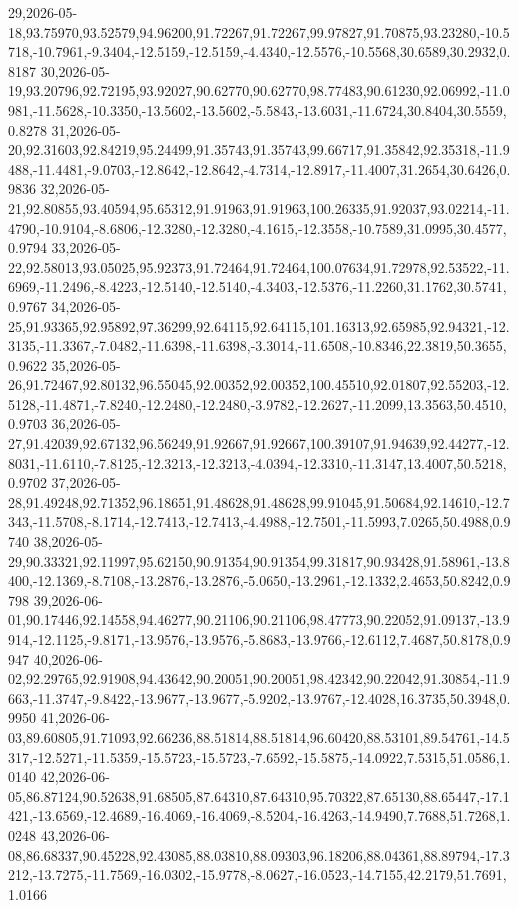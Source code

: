 \documentclass{eic-bcc-tcc}
\begin{document}
{29,2026-05-18,93.75970,93.52579,94.96200,91.72267,91.72267,99.97827,91.70875,93.23280,-10.5718,-10.7961,-9.3404,-12.5159,-12.5159,-4.4340,-12.5576,-10.5568,30.6589,30.2932,0.8187
30,2026-05-19,93.20796,92.72195,93.92027,90.62770,90.62770,98.77483,90.61230,92.06992,-11.0981,-11.5628,-10.3350,-13.5602,-13.5602,-5.5843,-13.6031,-11.6724,30.8404,30.5559,0.8278
31,2026-05-20,92.31603,92.84219,95.24499,91.35743,91.35743,99.66717,91.35842,92.35318,-11.9488,-11.4481,-9.0703,-12.8642,-12.8642,-4.7314,-12.8917,-11.4007,31.2654,30.6426,0.9836
32,2026-05-21,92.80855,93.40594,95.65312,91.91963,91.91963,100.26335,91.92037,93.02214,-11.4790,-10.9104,-8.6806,-12.3280,-12.3280,-4.1615,-12.3558,-10.7589,31.0995,30.4577,0.9794
33,2026-05-22,92.58013,93.05025,95.92373,91.72464,91.72464,100.07634,91.72978,92.53522,-11.6969,-11.2496,-8.4223,-12.5140,-12.5140,-4.3403,-12.5376,-11.2260,31.1762,30.5741,0.9767
34,2026-05-25,91.93365,92.95892,97.36299,92.64115,92.64115,101.16313,92.65985,92.94321,-12.3135,-11.3367,-7.0482,-11.6398,-11.6398,-3.3014,-11.6508,-10.8346,22.3819,50.3655,0.9622
35,2026-05-26,91.72467,92.80132,96.55045,92.00352,92.00352,100.45510,92.01807,92.55203,-12.5128,-11.4871,-7.8240,-12.2480,-12.2480,-3.9782,-12.2627,-11.2099,13.3563,50.4510,0.9703
36,2026-05-27,91.42039,92.67132,96.56249,91.92667,91.92667,100.39107,91.94639,92.44277,-12.8031,-11.6110,-7.8125,-12.3213,-12.3213,-4.0394,-12.3310,-11.3147,13.4007,50.5218,0.9702
37,2026-05-28,91.49248,92.71352,96.18651,91.48628,91.48628,99.91045,91.50684,92.14610,-12.7343,-11.5708,-8.1714,-12.7413,-12.7413,-4.4988,-12.7501,-11.5993,7.0265,50.4988,0.9740
38,2026-05-29,90.33321,92.11997,95.62150,90.91354,90.91354,99.31817,90.93428,91.58961,-13.8400,-12.1369,-8.7108,-13.2876,-13.2876,-5.0650,-13.2961,-12.1332,2.4653,50.8242,0.9798
39,2026-06-01,90.17446,92.14558,94.46277,90.21106,90.21106,98.47773,90.22052,91.09137,-13.9914,-12.1125,-9.8171,-13.9576,-13.9576,-5.8683,-13.9766,-12.6112,7.4687,50.8178,0.9947
40,2026-06-02,92.29765,92.91908,94.43642,90.20051,90.20051,98.42342,90.22042,91.30854,-11.9663,-11.3747,-9.8422,-13.9677,-13.9677,-5.9202,-13.9767,-12.4028,16.3735,50.3948,0.9950
41,2026-06-03,89.60805,91.71093,92.66236,88.51814,88.51814,96.60420,88.53101,89.54761,-14.5317,-12.5271,-11.5359,-15.5723,-15.5723,-7.6592,-15.5875,-14.0922,7.5315,51.0586,1.0140
42,2026-06-05,86.87124,90.52638,91.68505,87.64310,87.64310,95.70322,87.65130,88.65447,-17.1421,-13.6569,-12.4689,-16.4069,-16.4069,-8.5204,-16.4263,-14.9490,7.7688,51.7268,1.0248
43,2026-06-08,86.68337,90.45228,92.43085,88.03810,88.09303,96.18206,88.04361,88.89794,-17.3212,-13.7275,-11.7569,-16.0302,-15.9778,-8.0627,-16.0523,-14.7155,42.2179,51.7691,1.0166
}
\end{document}

